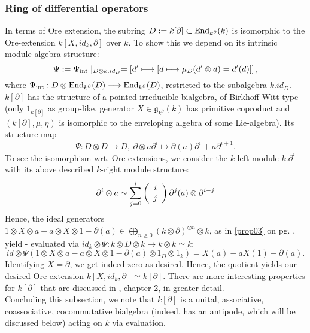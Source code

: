 \subsubsection{Ring of differential operators}
In terms of Ore extension, the subring $D := k[\partial] \subset \trm{End}_{k^\partial}(k)$ is isomorphic to the Ore-extension $k[X,id_k,\partial]$ over $k$. To show this we depend on its intrinsic module algebra structure:\\
$$\Psi := \Psi_{\trm{int}} \mid_{D \otimes k.id_D} = \left[d' \longmapsto \left[d \longmapsto \mu_D(d' \otimes d) = d'(d)\right]\right],$$
where $\Psi_{\trm{int}} : D \otimes \trm{End}_{k^\partial}(D) \longrightarrow \trm{End}_{k^\partial}(D)$, restricted to the subalgebra $k.id_D$.
\indent $k[\partial]$ has the structure of a pointed-irreducible bialgebra, of Birkhoff-Witt type (only $1_{k[\partial]}$ as group-like, generator $X \in \mathfrak{g}_{k^\partial}(k)$ has primitive coproduct and $(k[\partial],\mu,\eta)$ is isomorphic to the enveloping algebra of some Lie-algebra). Its structure map
$$\Psi : D \otimes D \longrightarrow D,\ \partial \otimes a \partial^i \longmapsto \partial(a) \partial^i + a \partial^{i+1}.$$
To see the isomorphism wrt. Ore-extensions, we consider the $k$-left module $k.\partial^i$ with its above described $k$-right module structure:
$$\partial^i \otimes a \sim \sum_{j=0}^i \left(\bao{c}i\\j\\\ea\right) \partial^j(a) \otimes \partial^{i-j}$$
Hence, the ideal generators $1 \otimes X \otimes a - a \otimes X \otimes 1 - \partial(a) \in \bigoplus_{n \geq 0} (k \otimes \partial)^{\otimes n} \otimes k$, as in \ref{prop03} on pg. \pageref{prop03}, yield - evaluated via $id_k \otimes \Psi : k \otimes D \otimes k \longrightarrow k \otimes k \simeq k$:
$$id \otimes \Psi(1 \otimes X \otimes a - a \otimes X \otimes 1 - \partial(a) \otimes 1_D \otimes 1_k) = X(a) - a X(1) - \partial(a).$$
Identifying $X = \partial$, we get indeed zero as desired. Hence, the quotient yields our desired Ore-extension $k[X,id_k,\partial] \simeq k[\partial]$. There are more interesting properties for $k[\partial]$ that are discussed in \cite{vdPS01}, chapter 2, in greater detail.\\
\indent Concluding this subsection, we note that $k[\partial]$ is a unital, associative, coassociative, cocommutative bialgebra (indeed, has an antipode, which will be discussed below) acting on $k$ via evaluation.
